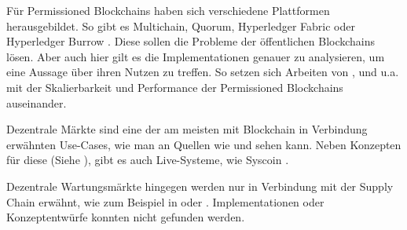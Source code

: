 Für Permissioned Blockchains haben sich verschiedene Plattformen herausgebildet. So gibt es Multichain, Quorum, Hyperledger Fabric oder Hyperledger Burrow \cite{BenHamidaBlockchainEnterpriseOverview2017}. Diese sollen die Probleme der öffentlichen Blockchains lösen. Aber auch hier gilt es die Implementationen genauer zu analysieren, um eine Aussage über ihren Nutzen zu treffen. So setzen sich Arbeiten von \cite{BenHamidaBlockchainEnterpriseOverview2017}\cite{LiScalablePrivateIndustrial2017}, \cite{PongnumkulPerformanceAnalysisPrivate2017} und \cite{VukolicRethinkingPermissionedBlockchains2017} u.a. mit der Skalierbarkeit und Performance der Permissioned Blockchains auseinander.

Dezentrale Märkte sind eine der am meisten mit Blockchain in Verbindung erwähnten Use-Cases, wie man an Quellen wie \cite{BenHamidaBlockchainEnterpriseOverview2017} und \cite{RavalDecentralizedApplicationsHarnessing2016} sehen kann.
Neben Konzepten für diese (Siehe \cite{KaiserDecentralizedPrivateMarketplace}), gibt es auch Live-Systeme, wie Syscoin \cite{SidhuSyscoinPeertoPeerElectronic2017}.

Dezentrale Wartungsmärkte hingegen werden nur in Verbindung mit der Supply Chain erwähnt, wie zum Beispiel in \cite{SoldatosWhatDoesBlockchain2017} oder \cite{GotzeLufthansaIndustrySolutions}. Implementationen oder Konzeptentwürfe konnten nicht gefunden werden.




